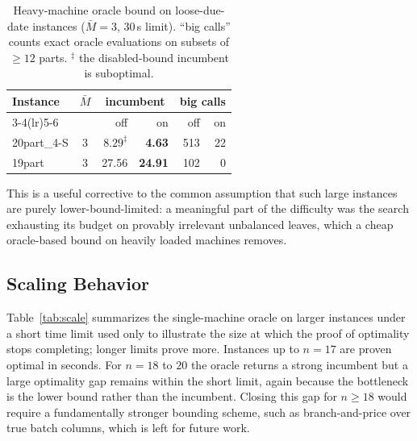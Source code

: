 \documentclass[letterpaper, 10 pt, conference]{ieeeconf}  %
\begin{document}
\begin{table}[t]
\centering
\caption{Heavy-machine oracle bound on loose-due-date instances ($\bar M=3$,
$30$\,s limit). ``big calls'' counts exact oracle evaluations on subsets of
$\ge 12$ parts. $^\ddagger$ the disabled-bound incumbent is suboptimal.}
\label{tab:heavy}
\begin{tabular}{l c r r r r}
\toprule
\multirow{2}{*}{Instance} & \multirow{2}{*}{$\bar M$}
 & \multicolumn{2}{c}{incumbent} & \multicolumn{2}{c}{big calls} \\
\cmidrule(lr){3-4}\cmidrule(lr){5-6}
 & & off & on & off & on \\
\midrule
20part\_4-S & 3 & $8.29^\ddagger$ & \textbf{4.63} & 513 & 22 \\
19part      & 3 & 27.56           & \textbf{24.91} & 102 & 0  \\
\bottomrule
\end{tabular}
\end{table}

This is a useful corrective to the common assumption that such large instances are
purely lower-bound-limited: a meaningful part of the difficulty was the search
exhausting its budget on provably irrelevant unbalanced leaves, which a cheap
oracle-based bound on heavily loaded machines removes.

\subsection{Scaling Behavior}
\label{subsec:res_scaling}

Table~\ref{tab:scale} summarizes the single-machine oracle on larger instances
under a short time limit used only to illustrate the size at which the proof of
optimality stops completing; longer limits prove more. Instances up to $n=17$
are proven optimal in seconds. For $n=18$ to $20$ the oracle returns a strong
incumbent but a large optimality gap remains within the short limit, again
because the bottleneck is the lower bound rather than the incumbent. Closing
this gap for $n\ge 18$ would require a fundamentally stronger bounding scheme,
such as branch-and-price over true batch columns, which is left for future work.
\end{document}

